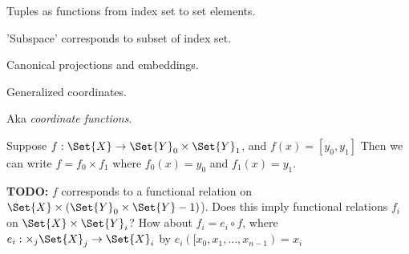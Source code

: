 Tuples as functions from index set to set elements.

'Subspace' corresponds to subset of index set.

Canonical projections and embeddings.

Generalized coordinates.

\label{sec:Cartesion-product-functions}

Aka \textit{coordinate functions}.

Suppose $f : \Set{X} \rightarrow \Set{Y}_0 \times \Set{Y}_1$,
and $f \left( x \right) = \left[ y_0 ,y_1 \right]$
Then we can write $f = f_0 \times f_1$ where
$f_0 \left( x \right) = y_0 $
and
$f_1 \left( x \right) = y_1 $.

\textbf{TODO:} $f$ corresponds to a functional relation on 
$\Set{X} \times \left( \Set{Y}_0 \times \Set{Y}-1 \right)$).
Does this imply functional relations $f_i$ on
$\Set{X} \times \Set{Y}_i$?
How about $f_i = e_i \circ f$,
where $e_i : \times_j \Set{X}_j  \rightarrow \Set{X}_i$ by
$e_i \left( [x_0, x_1, \ldots , x_{n-1} \right) = x_i$ 

